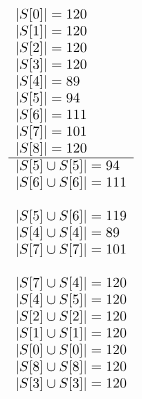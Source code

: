 \documentclass[12pt]{article}
\theoremstyle{definition}
\begin{document}
\[
\begin{array}[t]{l@{\qquad\qquad}l@{\qquad\qquad}l}
\begin{array}{l}
|S[0]| = 120 \\
|S[1]| = 120 \\
|S[2]| = 120 \\
|S[3]| = 120 \\
|S[4]| = 89 \\
|S[5]| = 94 \\
|S[6]| = 111 \\
|S[7]| = 101 \\
|S[8]| = 120 \\
\hline
|S[5] \cup S[5]| = 94 \\
|S[6] \cup S[6]| = 111 \\
  \\
|S[5] \cup S[6]| = 119 \\
|S[4] \cup S[4]| = 89 \\
|S[7] \cup S[7]| = 101 \\
  \\
|S[7] \cup S[4]| = 120 \\
|S[4] \cup S[5]| = 120 \\
|S[2] \cup S[2]| = 120 \\
|S[1] \cup S[1]| = 120 \\
|S[0] \cup S[0]| = 120 \\
|S[8] \cup S[8]| = 120 \\
|S[3] \cup S[3]| = 120 \\
 \end{array}
&
  \begin{array}{l}


\end{array}
\end{array}\]
\end{document}

